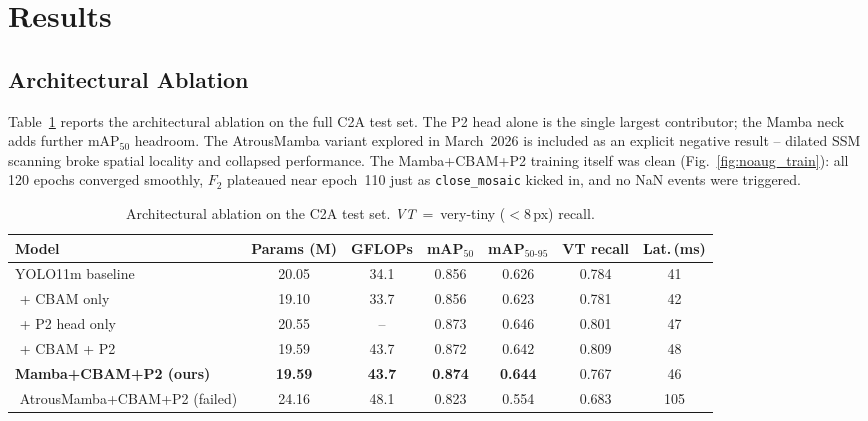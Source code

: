 \documentclass[11pt,a4paper]{article}
\begin{document}
\section{Results}
\subsection{Architectural Ablation}
Table~\ref{tab:ablation} reports the architectural ablation on the full
C2A test set. The P2 head alone is the single largest contributor; the
Mamba neck adds further mAP$_{50}$ headroom. The AtrousMamba variant
explored in March~2026 is included as an explicit negative result --
dilated SSM scanning broke spatial locality and collapsed performance.
The Mamba+CBAM+P2 training itself was clean
(Fig.~\ref{fig:noaug_train}): all 120 epochs converged smoothly, $F_2$
plateaued near epoch~110 just as \texttt{close\_mosaic} kicked in, and
no NaN events were triggered.

\begin{table}[H]
\centering
\caption{Architectural ablation on the C2A test set. \emph{VT}~=~very-tiny
($<$8\,px) recall.}\label{tab:ablation}
\small
\begin{tabular}{lcccccc}
\toprule
\textbf{Model} & \textbf{Params (M)} & \textbf{GFLOPs} &
\textbf{mAP$_{50}$} & \textbf{mAP$_{50\text{-}95}$} &
\textbf{VT recall} & \textbf{Lat.\,(ms)}\\
\midrule
YOLO11m baseline               & 20.05 & 34.1 & 0.856 & 0.626 & 0.784 & 41 \\
\,\,+ CBAM only                & 19.10 & 33.7 & 0.856 & 0.623 & 0.781 & 42 \\
\,\,+ P2 head only             & 20.55 & --   & 0.873 & 0.646 & 0.801 & 47 \\
\,\,+ CBAM + P2                & 19.59 & 43.7 & 0.872 & 0.642 & 0.809 & 48 \\
\textbf{Mamba+CBAM+P2 (ours)}  & \textbf{19.59} & \textbf{43.7} & \textbf{0.874} & \textbf{0.644} & 0.767 & 46 \\
\,\,AtrousMamba+CBAM+P2 (failed)& 24.16 & 48.1 & 0.823 & 0.554 & 0.683 & 105\\
\bottomrule
\end{tabular}
\end{table}
\end{document}
